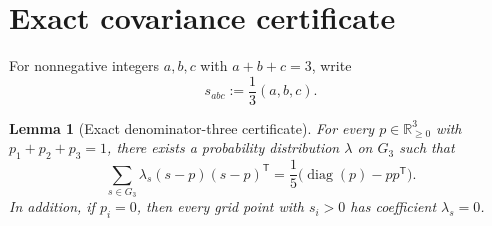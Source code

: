 \documentclass[11pt]{article}
\newtheorem{lemma}[theorem]{Lemma}
\theoremstyle{definition}
\theoremstyle{remark}
\newcommand{\R}{\mathbb{R}}
\newcommand{\diag}{\operatorname{diag}}
\begin{document}
\section{Exact covariance certificate}

For nonnegative integers $a,b,c$ with $a+b+c=3$, write
\[
s_{abc}:=\frac13(a,b,c).
\]

\begin{lemma}[Exact denominator-three certificate]
For every $p\in\R_{
\ge0}^3$ with $p_1+p_2+p_3=1$, there exists a probability distribution $\lambda$ on $G_3$ such that
\begin{equation}
\sum_{s\in G_3}\lambda_s(s-p)(s-p)^{\mathsf T}
=\frac15\bigl(\diag(p)-pp^{\mathsf T}\bigr).
\label{eq:certificate}
\end{equation}
In addition, if $p_i=0$, then every grid point with $s_i>0$ has coefficient $\lambda_s=0$.
\end{lemma}
\end{document}
